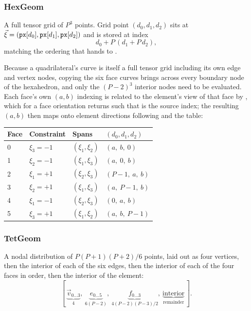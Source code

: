 \subsubsection{HexGeom}

A full tensor grid of $P^3$ points.  Grid point $(d_0, d_1, d_2)$ sits at
$\vec{\xi} = (\texttt{px}[d_0], \texttt{px}[d_1], \texttt{px}[d_2])$ and is stored
at index
%
$$
d_0 + P\,(d_1 + P\,d_2),
$$
%
matching the ordering that  hands to .

Because a quadrilateral's curve is itself a full tensor grid including its own
edge and vertex nodes, copying the six face curves brings across every
boundary node of the hexahedron, and only the $(P-2)^3$ interior nodes need to
be evaluated.  Each face's own $(a,b)$ indexing is related to the element's
view of that face by , which for a
face orientation returns  such that  is the
source index; the resulting $(a,b)$ then maps onto element directions
following  and the  table:

\begin{center}
\begin{tabular}{llll}
\hline
Face & Constraint & Spans & $(d_0, d_1, d_2)$ \\
\hline
0 & $\xi_3 = -1$ & $(\xi_1, \xi_2)$ & $(a,\ b,\ 0)$ \\
1 & $\xi_2 = -1$ & $(\xi_1, \xi_3)$ & $(a,\ 0,\ b)$ \\
2 & $\xi_1 = +1$ & $(\xi_2, \xi_3)$ & $(P-1,\ a,\ b)$ \\
3 & $\xi_2 = +1$ & $(\xi_1, \xi_3)$ & $(a,\ P-1,\ b)$ \\
4 & $\xi_1 = -1$ & $(\xi_2, \xi_3)$ & $(0,\ a,\ b)$ \\
5 & $\xi_3 = +1$ & $(\xi_1, \xi_2)$ & $(a,\ b,\ P-1)$ \\
\hline
\end{tabular}
\end{center}

\subsubsection{TetGeom}

A nodal distribution of $P(P+1)(P+2)/6$ points, laid out as four vertices,
then the interior of each of the six edges, then the interior of each of the
four faces in  order, then the interior of the element:
%
$$
[\, \underbrace{\vec{v}_{0\ldots3}}_{4},\
     \underbrace{e_{0\ldots5}}_{6(P-2)},\
     \underbrace{f_{0\ldots3}}_{4(P-2)(P-3)/2},\
     \underbrace{\text{interior}}_{\text{remainder}} \,].
$$

